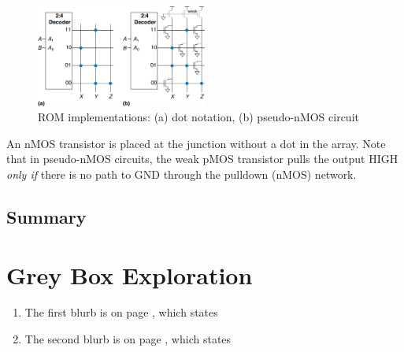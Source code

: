 \documentclass[12pt]{article}
\numberwithin{figure}{subsection}
\numberwithin{table}{subsection}
\numberwithin{equation}{subsection}
\begin{document}
\begin{enumerate}
  \begin{figure}[ht]
    \centering
    \includegraphics[width=0.5\textwidth]{rom_pseudo_nmos_implementation.png}
    \caption{ROM implementations: (a) dot notation, (b) pseudo-nMOS circuit}
    \label{fig:rom_pseudo_nmos_implementation}
  \end{figure}
\end{enumerate}

An nMOS transistor is placed at the junction without a dot in the array. Note that in pseudo-nMOS circuits, the weak pMOS transistor pulls the output HIGH \textit{only if} there is no path to GND through the pulldown (nMOS) network.

\subsection{Summary}

\section{Grey Box Exploration}

\begin{enumerate}
  \item The first blurb is on page , which states \textit{}

  \item The second blurb is on page , which states \textit{}
\end{enumerate}

\end{document}
